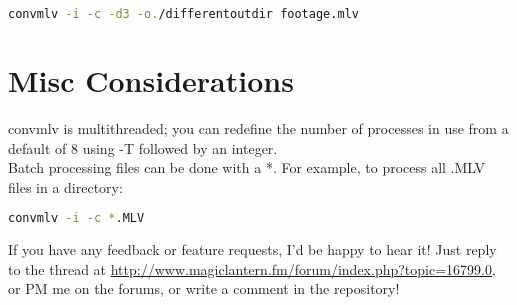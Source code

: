 \documentclass[a4paper,12pt]{article}
\begin{document}
\begin{lstlisting}[language=bash]
	convmlv -i -c -d3 -o./differentoutdir footage.mlv
\end{lstlisting}

\section{Misc Considerations}
	convmlv is multithreaded; you can redefine the number of processes in use from a default of 8 using -T followed by an integer.\\
	
	Batch processing files can be done with a *. For example, to process all .MLV files in a directory:
	
\begin{lstlisting}[language=bash]
	convmlv -i -c *.MLV
\end{lstlisting}
	
	If you have any feedback or feature requests, I'd be happy to hear it! Just reply to the thread at 
	\url{http://www.magiclantern.fm/forum/index.php?topic=16799.0}, or PM me on the forums, or write a comment in the repository!
\end{document}

